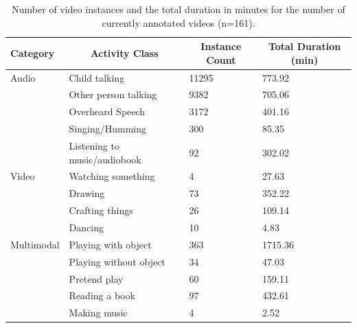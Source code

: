 \documentclass[
  man,floatsintext]{apa6}
\begin{document}
\begin{table}[H]

\begin{center}
\begin{threeparttable}

\caption{\label{tab:activity-classes-statistics}Number of video instances and the total duration in minutes for the number of currently annotated videos (n=161).}

\begin{tabular}{llll}
\toprule
Category & \multicolumn{1}{c}{Activity Class} & \multicolumn{1}{c}{Instance Count} & \multicolumn{1}{c}{Total Duration (min)}\\
\midrule
Audio & Child talking & 11295 & 773.92\\
 & Other person talking & 9382 & 705.06\\
 & Overheard Speech & 3172 & 401.16\\
 & Singing/Humming & 300 & 85.35\\
 & Listening to music/audiobook & 92 & 302.02\\
Video & Watching something & 4 & 27.63\\
 & Drawing & 73 & 352.22\\
 & Crafting things & 26 & 109.14\\
 & Dancing & 10 & 4.83\\
Multimodal & Playing with object & 363 & 1715.36\\
 & Playing without object & 34 & 47.03\\
 & Pretend play & 60 & 159.11\\
 & Reading a book & 97 & 432.61\\
 & Making music & 4 & 2.52\\
\bottomrule
\end{tabular}

\end{threeparttable}
\end{center}

\end{table}
\end{document}
